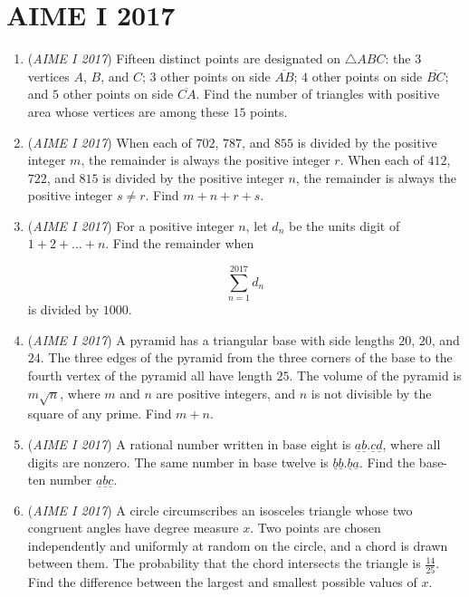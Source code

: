 \section{AIME I 2017}
        \begin{enumerate}
        	\item (\textit{AIME I 2017}) Fifteen distinct points are designated on $\triangle ABC$: the 3 vertices $A$, $B$, and $C$; $3$ other points on side $\overline{AB}$; $4$ other points on side $\overline{BC}$; and $5$ other points on side $\overline{CA}$. Find the number of triangles with positive area whose vertices are among these $15$ points.


 

	\item (\textit{AIME I 2017}) When each of $702$, $787$, and $855$ is divided by the positive integer $m$, the remainder is always the positive integer $r$. When each of $412$, $722$, and $815$ is divided by the positive integer $n$, the remainder is always the positive integer $s \neq r$. Find $m+n+r+s$.


 

	\item (\textit{AIME I 2017}) For a positive integer $n$, let $d_n$ be the units digit of $1 + 2 + \dots + n$. Find the remainder when

 \[\sum_{n=1}^{2017} d_n\]is divided by $1000$.


 

	\item (\textit{AIME I 2017}) A pyramid has a triangular base with side lengths $20$, $20$, and $24$. The three edges of the pyramid from the three corners of the base to the fourth vertex of the pyramid all have length $25$. The volume of the pyramid is $m\sqrt{n}$, where $m$ and $n$ are positive integers, and $n$ is not divisible by the square of any prime. Find $m+n$.


 

	\item (\textit{AIME I 2017}) A rational number written in base eight is $\underline{a} \underline{b} . \underline{c} \underline{d}$, where all digits are nonzero. The same number in base twelve is $\underline{b} \underline{b} . \underline{b} \underline{a}$. Find the base-ten number $\underline{a} \underline{b} \underline{c}$.


 

	\item (\textit{AIME I 2017}) A circle circumscribes an isosceles triangle whose two congruent angles have degree measure $x$. Two points are chosen independently and uniformly at random on the circle, and a chord is drawn between them. The probability that the chord intersects the triangle is $\frac{14}{25}$. Find the difference between the largest and smallest possible values of $x$.



\end{enumerate}
